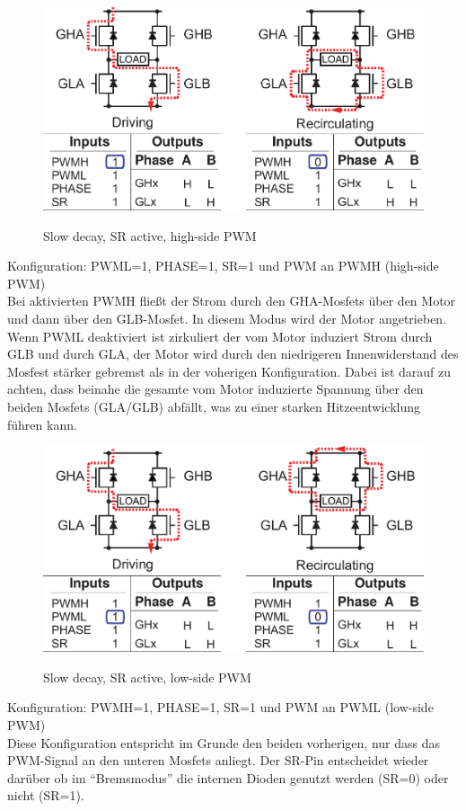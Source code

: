 \begin{figure}[H]
\centering
\includegraphics[width=.8\textwidth]{3941_2.png}\\
\caption{Slow decay, SR active, high-side PWM \cite{ds-A3941}}%
\label{fig:39412}
\end{figure}

Konfiguration: PWML=1, PHASE=1, SR=1 und PWM an PWMH (high-side PWM)\\
Bei aktivierten PWMH fließt der Strom durch den GHA-Mosfets über den Motor und
dann über den GLB-Mosfet. In diesem Modus wird der Motor angetrieben.
Wenn PWML deaktiviert ist zirkuliert der vom Motor induziert Strom durch 
GLB und durch GLA, der Motor wird durch den niedrigeren Innenwiderstand des Mosfest 
stärker gebremst als in der voherigen Konfiguration. Dabei ist darauf zu achten, dass
beinahe die gesamte vom Motor induzierte Spannung über den beiden Mosfets (GLA/GLB) abfällt,
was zu einer starken Hitzeentwicklung führen kann.



\begin{figure}[H]
\centering
\includegraphics[width=.8\textwidth]{3941_3.png}\\
\caption{Slow decay, SR active, low-side PWM \cite{ds-A3941}}%
\label{fig:39413}
\end{figure}

Konfiguration: PWMH=1, PHASE=1, SR=1 und PWM an PWML (low-side PWM)\\
Diese Konfiguration entspricht im Grunde den beiden vorherigen, nur dass das PWM-Signal
an den unteren Mosfets anliegt. Der SR-Pin entscheidet wieder darüber ob im ``Bremsmodus''
die internen Dioden genutzt werden (SR=0) oder nicht (SR=1).




